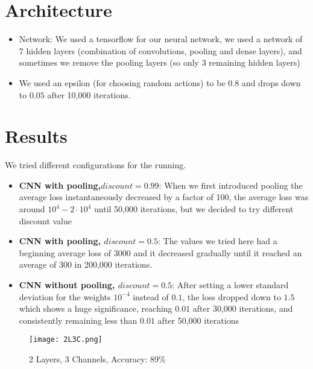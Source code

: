 \documentclass[a4paper]{article}
\begin{document}
\section{Architecture}
\begin{itemize}
\item Network: We used a tensorflow for our neural network, we used a network of 7 hidden layers (combination of convolutions, pooling and dense layers), and sometimes we remove the pooling layers (so only 3 remaining hidden layers)
\item We used an epsilon (for choosing random actions) to be $0.8$ and drops down to $0.05$ after 10,000 iterations.
\end{itemize}

\section{Results}
We tried different configurations for the running.
\begin{itemize}
\item {\bf CNN with pooling,$discount=0.99$}: When we first introduced pooling the average loss instantaneously decreased by a factor of 100, the average loss was around $10^4 - 2 \cdot 10^4$ until 50,000 iterations, but we decided to try different discount value
\item {\bf CNN with pooling, $discount = 0.5$}: The values we tried here had a beginning average loss of $3000$ and it decreased gradually until it reached an average of $300$ in 200,000 iterations.
\item {\bf CNN without pooling, $discount=0.5$}: After setting a lower standard deviation for the weights $10^{-4}$ instead of $0.1$, the loss dropped down to $1.5$ which shows a huge significance, reaching $0.01$ after 30,000 iterations, and consistently remaining less than $0.01$ after 50,000 iterations
\end{itemize}




\iffalse
\begin{figure}[h]
\centerline{\texttt{[image: 2L3C.png]}}
\caption{2 Layers, 3 Channels, Accuracy: 89\%}\label{placeholder}
\end{figure}
\end{document}
